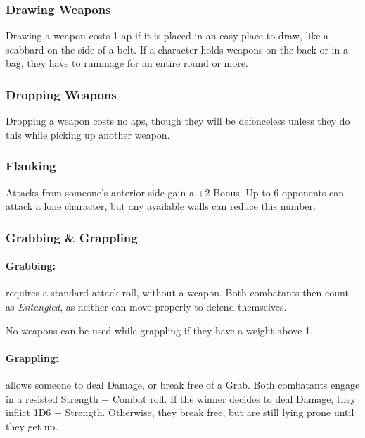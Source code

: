 \begin{multicols}{2}
\subsubsection[Drawing Weapon -- Cost: 1 \glsentrytext{ap}]{Drawing Weapons}

Drawing a weapon costs 1 \gls{ap} if it is placed in an easy place to draw, like a scabbard on the side of a belt.
If a character holds weapons on the back or in a bag, they have to rummage for an entire round or more.

\subsubsection[Dropping Weapon -- Cost: 0 \gls{ap}]{Dropping Weapons}

Dropping a weapon costs no \glspl{ap}, though they will be defenceless unless they do this while picking up another weapon.


\subsubsection[Flanking: Gain +2 to attack]{Flanking}\label{flank}

Attacks from someone's anterior side gain a +2 Bonus.
Up to 6 opponents can attack a lone character, but any available walls can reduce this number.

\subsubsection{Grabbing \& Grappling}
\label{grappling}

\paragraph[Grabs: Make an attack without any weapon bonus. Both combatants are \textit{Entangled}. Cost: 1 \gls{ap}]{Grabbing:}
requires a standard attack roll, without a weapon.
Both combatants then count as \textit{Entangled}, as neither can move properly to defend themselves.
\label{grab}

No weapons can be used while grappling if they have a \gls{weight} above 1.

\paragraph[Grapple: Make an opposted roll of Strength + Combat.  Success means the combatant can either break free or inflict Damage.  Cost: 3 \gls{ap}]{Grappling:}
allows someone to deal Damage, or break free of a Grab.
Both combatants engage in a resisted Strength + Combat roll.
If the winner decides to deal Damage, they inflict 1D6 + Strength.
Otherwise, they break free, but are still lying prone until they get up.
\label{grapple}


\end{multicols}
